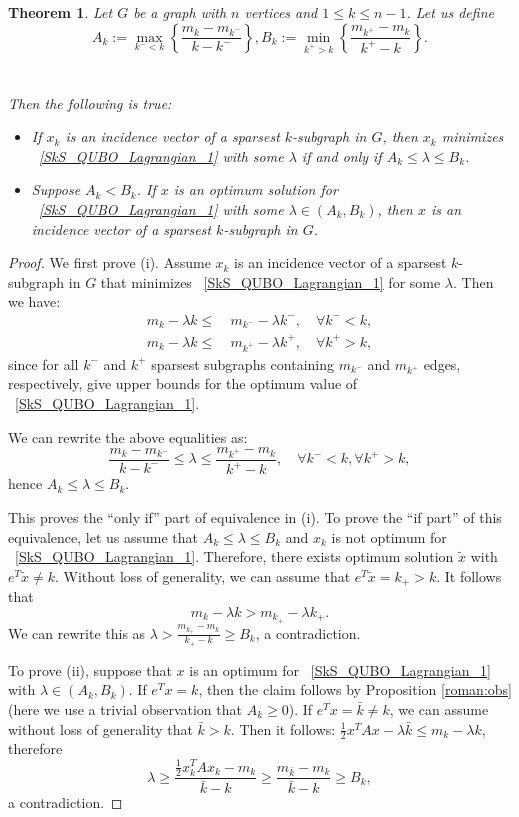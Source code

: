 \documentclass{article}
\newtheorem{thm}{Theorem}
\begin{document}
\begin{thm}\label{roman:existence}
Let  $G$ be a graph with $n$ vertices and  $1\le k\le n-1$. Let us define 
$$
A_k := \max_{k^-<k}\left\{ \frac{m_{k}-m_{k^-}}{k-k^-}\right\}, B_k := \min_{k^+>k}\left\{\frac{m_{k^+}-m_k}{k^+-k}\right\}.
$$\\
\\
Then the following is true:
\begin{itemize}
    \item [(i)] If $x_k$ is an incidence vector of a sparsest $k$-subgraph in $G$, then  
    $x_k$ minimizes ~\eqref{SkS_QUBO_Lagrangian_1} with some $\lambda$ if and only if 
 $ A_k\leq \lambda \leq B_k$.
   \item[(ii)]
   Suppose $A_k<B_k$. 
   If $x$ is an optimum solution for ~\eqref{SkS_QUBO_Lagrangian_1} with some $\lambda \in (A_k,B_k)$, then $x$ is an incidence vector of a sparsest $k$-subgraph in $G$.
\end{itemize}

\end{thm}

\begin{proof}
We first prove (i).
Assume $x_k$  is an incidence vector of a sparsest $k$-subgraph in $G$ that minimizes ~\eqref{SkS_QUBO_Lagrangian_1} for some $\lambda$. Then we have:
\begin{align*}
m_k -\lambda k \le & ~ m_{k^-} - \lambda k^-,\quad \forall k^-<k,\\
m_k -\lambda k  \le & ~ m_{k^+} - \lambda k^+,\quad \forall k^+>k,     
\end{align*}
since for all $k^-$ and $k^+$ sparsest subgraphs 
containing $m_{k^-}$ and $m_{k^+}$ edges, respectively, give upper bounds for the optimum value of ~\eqref{SkS_QUBO_Lagrangian_1}.

We can rewrite the above equalities as:
$$
\frac{m_{k}-m_{k^-}}{k-k^-}\leq\lambda\leq \frac{m_{k^+}-m_k}{k^+-k}, \quad \forall k^-<k,\forall  k^+>k,
$$
hence $A_k\leq \lambda \leq B_k.$


This proves the ``only if'' part of equivalence in (i).
To prove the ``if part'' of this equivalence, let us assume that $ A_k\leq \lambda \leq B_k$ and $x_k$ is not optimum for ~\eqref{SkS_QUBO_Lagrangian_1}.
Therefore, there exists optimum solution  $\tilde x$ with $e^T\tilde x \neq k$. Without loss of generality, we can assume that    $e^T\tilde x=k_+>k$.
It follows that
$$m_k-\lambda k > m_{k_+}-\lambda k_+.$$
We can rewrite this as 
$ \lambda > \frac{m_{k_+}-m_k}{k_+-k}\ge B_k$, a contradiction.

To prove (ii), suppose  that $x$   is an optimum for ~\eqref{SkS_QUBO_Lagrangian_1} with 
$\lambda \in (A_k,B_k)$.
 If $e^Tx=k$, then the claim follows by Proposition \ref{roman:obs} (here we use a trivial observation that $A_k\ge 0$).
 If $e^Tx=\bar k\neq k$, we can assume without loss of generality that
  $\bar k > k$. 
Then  it follows:
    $\frac{1}{2}x^TAx-\lambda\bar k  \le  m_k-\lambda k$, therefore 
  $$\lambda \ge  \frac{\frac{1}{2}x_k^TAx_k-m_k}{\bar k-k}\ge \frac{m_{\bar k}-m_k}{\bar k - k} \ge B_k,$$
  a contradiction.
\end{proof}
\end{document}
